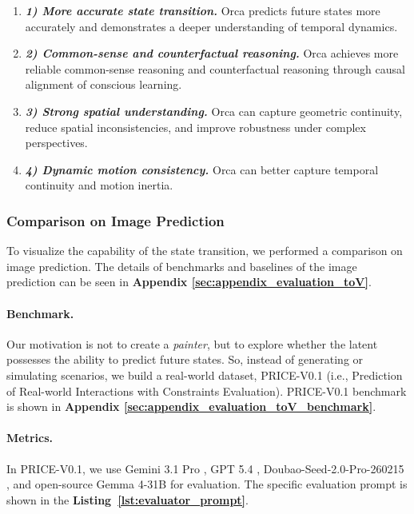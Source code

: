 \vspace{-1ex}
\begin{enumerate}[
    leftmargin=1.35em,
    itemsep=0.35em,
    topsep=0.35em,
    parsep=0em
]
    \item[] \textbf{\textit{1) More accurate state transition.}} 
    Orca predicts future states more accurately and demonstrates a deeper understanding of temporal dynamics.
    
    \item[] \textbf{\textit{2) Common-sense and counterfactual reasoning.}}
    Orca achieves more reliable common-sense reasoning and counterfactual reasoning through causal alignment of conscious learning.
    
    \item[] \textbf{\textit{3) Strong spatial understanding.}}
    Orca can capture geometric continuity, reduce spatial inconsistencies, and improve robustness under complex perspectives.

    \item[] \textbf{\textit{4) Dynamic motion consistency.}}
    Orca can better capture temporal continuity and motion inertia.
\end{enumerate}






\subsubsection{Comparison on Image Prediction}\label{sec:evaluation_toV}



To visualize the capability of the state transition, we performed a comparison on image prediction. The details of benchmarks and baselines of the image prediction can be seen in \textbf{Appendix \ref{sec:appendix_evaluation_toV}}.

\paragraph{Benchmark.} Our motivation is not to create a \textit{painter}, but to explore whether the latent possesses the ability to predict future states. So, instead of generating or simulating scenarios, we build a real-world dataset, PRICE-V0.1 (i.e., Prediction of Real-world Interactions with Constraints Evaluation). 
PRICE-V0.1  benchmark is shown in \textbf{Appendix \ref{sec:appendix_evaluation_toV_benchmark}}. 

\paragraph{Metrics.} In PRICE-V0.1, we use Gemini 3.1 Pro \citep{Gemini-3.1-pro}, GPT 5.4 \citep{GPT54}, Doubao-Seed-2.0-Pro-260215 \citep{doubao-seed-2.0-pro}, and open-source Gemma 4-31B \citep{Gemma4} for evaluation. The specific evaluation prompt is shown in the \textbf{Listing~\ref{lst:evaluator_prompt}}. 

